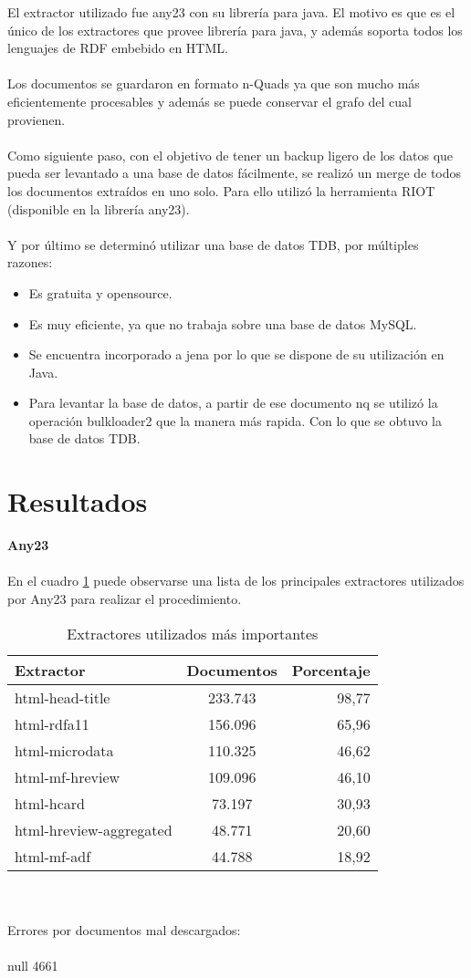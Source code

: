 \noindent El extractor utilizado fue any23 con su librería para java. El motivo es que es el único de los extractores que provee 
librería para java, y además soporta todos los lenguajes de RDF embebido en HTML.
\\\\
Los documentos se guardaron en formato n-Quads ya que son mucho más eficientemente procesables y además se puede conservar el grafo 
del cual provienen.
\\\\
Como siguiente paso, con el objetivo de tener un backup ligero de los datos que pueda ser levantado a una base de datos fácilmente, se realizó un merge de todos los documentos extraídos en uno solo.
Para ello utilizó la herramienta RIOT (disponible en la librería any23).
\\\\
Y por último se determinó utilizar una base de datos TDB, por múltiples razones:
\begin{itemize}
\item Es gratuita y opensource. 
\item Es muy eficiente, ya que no trabaja sobre una base de datos MySQL.
\item Se encuentra incorporado a jena por lo que se dispone de su utilización en Java.
\item Para levantar la base de datos, a partir de ese documento nq se utilizó la operación bulkloader2 que la manera más rapida. Con lo que se obtuvo la base de datos TDB.
\end{itemize}

\section{Resultados}

\textbf{Any23}
\\\\
En el cuadro \ref{table:Extractors} puede observarse una lista de los principales extractores utilizados por Any23 para realizar el 
procedimiento.
\begin{table}[h]
\begin{tabular}{| l | c | r | }\hline
Extractor & Documentos & Porcentaje \\\hline
html-head-title & 233.743 & 98,77 \\    
html-rdfa11 & 156.096 & 65,96 \\
html-microdata & 110.325 & 46,62 \\    
html-mf-hreview & 109.096 & 46,10 \\
html-hcard & 73.197 & 30,93  \\
html-hreview-aggregated & 48.771 & 20,60 \\
html-mf-adf & 44.788 & 18,92 \\\hline
 \end{tabular}
\caption{Extractores utilizados más importantes}
\label{table:Extractors}
\end{table}
\\
\\
Errores por documentos mal descargados:
\\\\
null 4661

